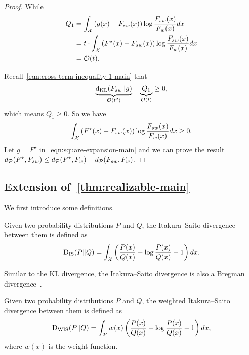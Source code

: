 \begin{proof}
While
\begin{align*}
    Q_1 & = \int_{\mathcal{X}} \left( g(x) - F_{sw}(x) \right) \log  \frac{F_{sw}(x)}{F_w(x)} d x
    \\ & = t \cdot \int_{\mathcal{X}} \left( F^\star(x) - F_{sw}(x) \right) \log  \frac{F_{sw}(x)}{F_w(x)} d x
    \\ & = \mathcal{O}(t).
\end{align*}

Recall~\cref{eqn:cross-term-inequality-1-main} that
$$\underbrace{\mathrm{d}_{\mathrm{KL}}(F_{sw} \| g)}_{\mathcal{O}(t^2)} + \underbrace{Q_1}_{\mathcal{O}(t)} \ge 0,$$
which means $Q_1 \ge 0$.
So we have 
$$\int_{\mathcal{X}} \left( F^\star(x) - F_{sw}(x) \right) \log  \frac{F_{sw}(x)}{F_w(x)} d x \ge 0.$$
Let $g=F^\star$ in~\cref{eqn:square-expansion-main} and we can prove the result $d_\mathcal{P}(F^\star, F_{sw}) \le d_\mathcal{P}(F^\star, F_w) - d_\mathcal{P}(F_{sw}, F_w)$.

\end{proof}













\subsection{Extension of~\cref{thm:realizable-main}} \label{proof_theorem_1}


We first introduce some definitions.

\begin{definition}
Given two probability distributions $P$ and $Q$, the Itakura–Saito divergence between them is defined as
$$\mathrm{D}_{\mathrm{IS}}(P \| Q) = \int_{\mathcal{X}} \left( \frac{P(x)}{Q(x)} - \log \frac{P(x)}{Q(x)} - 1 \right) d x.$$
\end{definition}

Similar to the KL divergence, the Itakura–Saito divergence is also a Bregman divergence~\citep{inderjit_bregman}.



\begin{definition}
Given two probability distributions $P$ and $Q$, the weighted Itakura–Saito divergence between them is defined as
$$\mathrm{D}_{\mathrm{WIS}}(P \| Q) = \int_{\mathcal{X}} w(x) \left( \frac{P(x)}{Q(x)} - \log \frac{P(x)}{Q(x)} - 1 \right) d x,$$
where $w(x)$ is the weight function.
\end{definition}


